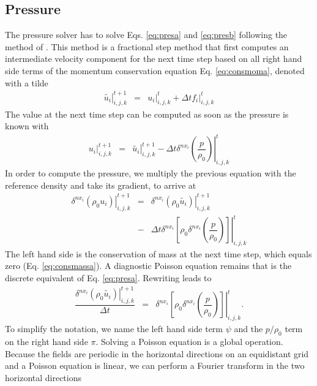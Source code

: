 \documentclass[gmd]{copernicus}
\begin{document}
\subsection{Pressure}
The pressure solver has to solve Eqs. \ref{eq:presa} and \ref{eq:presb} following the method of \citet{Chorin1968}. This method is a fractional step method that first computes an intermediate velocity component for the next time step based on all right hand side terms of the momentum conservation equation Eq. \ref{eq:consmoma}, denoted with a tilde
\begin{eqnarray}
\left. \widetilde{u_i} \right|^{t+1}_{i,j,k} & = & \left. u_i \right|^{t}_{i,j,k} + \Delta t \left. f_i \right|^{t}_{i,j,k}
\end{eqnarray}
The value at the next time step can be computed as soon as the pressure is known with
\begin{eqnarray}
\left. u_i\right|^{t+1}_{i,j,k} & = & \left. \widetilde{u_i} \right|^{t+1}_{i,j,k} - \Delta t \left. \delta^{nx_i}\left( \dfrac{p}{\rho_0}\right)\right|^t_{i,j,k}
\end{eqnarray}
In order to compute the pressure, we multiply the previous equation with the reference density and take its gradient, to arrive at
\begin{eqnarray}
\nonumber \left. \delta^{nx_i} \left( \rho_0 u_i\right) \right|^{t+1}_{i,j,k} & = & 
\left. \delta^{nx_i} \left( \rho_0 \widetilde{u_i} \right) \right|^{t+1}_{i,j,k}\\
& - &  \Delta t \left.\delta^{nx_i} \left[ \rho_0 \delta^{nx_i}\left( \dfrac{p}{\rho_0}\right) \right] \right|^t_{i,j,k}
\end{eqnarray}
The left hand side is the conservation of mass at the next time step, which equals zero (Eq. \ref{eq:consmassa}). A diagnostic Poisson equation remains that is the discrete equivalent of Eq. \ref{eq:presa}. Rewriting leads to
\begin{eqnarray}
\dfrac{\left. \delta^{nx_i} \left( \rho_0 \widetilde{u_i} \right) \right|^{t+1}_{i,j,k}}{\Delta t}
& = &  \left. \delta^{nx_i} \left[ \rho_0 \delta^{nx_i}\left( \dfrac{p}{\rho_0}\right) \right] \right|^t_{i,j,k}.
\end{eqnarray}
To simplify the notation, we name the left hand side term $\psi$ and the $p / \rho_0$ term on the right hand side $\pi$. Solving a Poisson equation is a global operation. Because the fields are periodic in the horizontal directions on an equidistant grid and a Poisson equation is linear, we can perform a Fourier transform in the two horizontal directions
\end{document}
